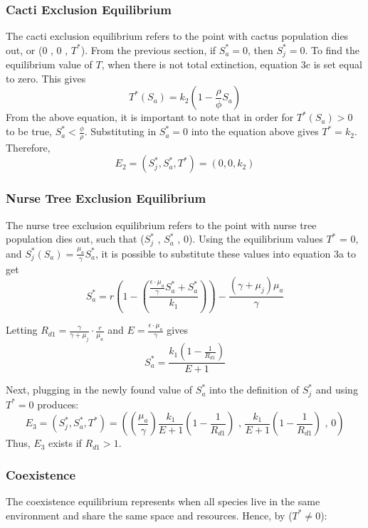 \documentclass[a4paper]{article}
\begin{document}
\subsubsection{Cacti Exclusion Equilibrium}
The cacti exclusion equilibrium refers to the point with cactus population dies out, or (0 , 0 , $T^*$). From the previous section, if $S_a^* = 0$, then $ S_j^* = 0$. To find the equilibrium value of $T$, when there is not total extinction, equation 3c is set equal to zero. This gives 
\begin{equation*}
T^*(S_a) = k_2\left(1-\displaystyle\frac{\rho}{\phi}S_a\right)
\end{equation*}
From the above equation, it is important to note that in order for $T^*(S_a) > 0$ to be true, $S_a^*<\displaystyle\frac{\phi}{\rho}$.  Substituting in $S^*_a = 0$ into the equation above gives $T^* = k_2$. Therefore, $$E_2 = (S_j^* , S_a^* , T^*) =(0 , 0 , k_2)$$

\subsubsection{Nurse Tree Exclusion Equilibrium}
The nurse tree exclusion equilibrium refers to the point with nurse tree population dies out, such that ($S_j^*$ , $S_a^*$ , 0). Using the equilibrium values $T^*$ = 0, and $S_j^*(S_a) = \displaystyle\frac{\mu_a}{\gamma} S_a^*$, it is possible to substitute these values into equation 3a to get $$S_a^* = r\left(1 - \left(\displaystyle\frac{\displaystyle\frac{\epsilon\cdot \mu_a}{\gamma}S_a^* + S_a^*}{k_1}\right)\right) - \displaystyle\frac{\left(\gamma+\mu_j\right)\mu_a}{\gamma}$$

Letting $R_{d1} = \displaystyle\frac{\gamma}{\gamma+\mu_j} \cdot\displaystyle\frac{r}{\mu_a}$ and $E=\displaystyle\frac{\epsilon \cdot \mu_a}{\gamma} $ gives 
\begin{equation*}
S_a^* = \displaystyle\frac{k_1 \left(1 - \displaystyle\frac{1}{R_{d1}}\right)}{E+1}
\end{equation*}

Next, plugging in the newly found value of $S_a^*$ into the definition of $S_j^*$ and using $T^* = 0$ produces:
$$E_3 = (S_j^*,S_a^*,T^*) = \left(\left(\displaystyle\frac{\mu_a}{\gamma}\right) \displaystyle\frac{k_1}{E+1} \left(1 - \displaystyle\frac{1}{R_{d1}}\right) \text{ , }\displaystyle\frac{k_1}{E+1} \left(1 - \displaystyle\frac{1}{R_{d1}}\right)\text{ , }0\right)$$
Thus, $E_3$ exists if $R_{d1} > 1$.

\subsubsection{Coexistence}
The coexistence equilibrium represents when all species live in the same environment and share the same space and resources. 
Hence, by ($T^* \neq 0$):
\end{document}
